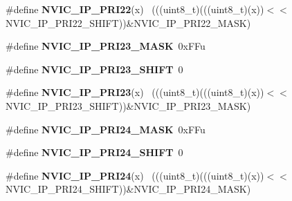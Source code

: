 \begin{DoxyCompactItemize}
\item 
\hypertarget{group___n_v_i_c___register___masks_ga68beece84805f68578bd39bd007ecfe3}{}\#define {\bfseries N\+V\+I\+C\+\_\+\+I\+P\+\_\+\+P\+R\+I22}(x)                                              ~(((uint8\+\_\+t)(((uint8\+\_\+t)(x))$<$$<$N\+V\+I\+C\+\_\+\+I\+P\+\_\+\+P\+R\+I22\+\_\+\+S\+H\+I\+F\+T))\&N\+V\+I\+C\+\_\+\+I\+P\+\_\+\+P\+R\+I22\+\_\+\+M\+A\+S\+K)\label{group___n_v_i_c___register___masks_ga68beece84805f68578bd39bd007ecfe3}

\item 
\hypertarget{group___n_v_i_c___register___masks_ga372050bfcc4aa59b744da6c41c343615}{}\#define {\bfseries N\+V\+I\+C\+\_\+\+I\+P\+\_\+\+P\+R\+I23\+\_\+\+M\+A\+S\+K}~0x\+F\+Fu\label{group___n_v_i_c___register___masks_ga372050bfcc4aa59b744da6c41c343615}

\item 
\hypertarget{group___n_v_i_c___register___masks_ga1d305286e1b025ac4eb96489399b259f}{}\#define {\bfseries N\+V\+I\+C\+\_\+\+I\+P\+\_\+\+P\+R\+I23\+\_\+\+S\+H\+I\+F\+T}~0\label{group___n_v_i_c___register___masks_ga1d305286e1b025ac4eb96489399b259f}

\item 
\hypertarget{group___n_v_i_c___register___masks_gaedf71c1ccd03debbbdf13d1ddb3f1e23}{}\#define {\bfseries N\+V\+I\+C\+\_\+\+I\+P\+\_\+\+P\+R\+I23}(x)                                              ~(((uint8\+\_\+t)(((uint8\+\_\+t)(x))$<$$<$N\+V\+I\+C\+\_\+\+I\+P\+\_\+\+P\+R\+I23\+\_\+\+S\+H\+I\+F\+T))\&N\+V\+I\+C\+\_\+\+I\+P\+\_\+\+P\+R\+I23\+\_\+\+M\+A\+S\+K)\label{group___n_v_i_c___register___masks_gaedf71c1ccd03debbbdf13d1ddb3f1e23}

\item 
\hypertarget{group___n_v_i_c___register___masks_gaa73ef95f88d7118350e5cf30c4fbbe96}{}\#define {\bfseries N\+V\+I\+C\+\_\+\+I\+P\+\_\+\+P\+R\+I24\+\_\+\+M\+A\+S\+K}~0x\+F\+Fu\label{group___n_v_i_c___register___masks_gaa73ef95f88d7118350e5cf30c4fbbe96}

\item 
\hypertarget{group___n_v_i_c___register___masks_ga3d01ac140e5f81472c930ab95d06927c}{}\#define {\bfseries N\+V\+I\+C\+\_\+\+I\+P\+\_\+\+P\+R\+I24\+\_\+\+S\+H\+I\+F\+T}~0\label{group___n_v_i_c___register___masks_ga3d01ac140e5f81472c930ab95d06927c}

\item 
\hypertarget{group___n_v_i_c___register___masks_ga08cc27672e6d5e3c74d1e89fa59231e3}{}\#define {\bfseries N\+V\+I\+C\+\_\+\+I\+P\+\_\+\+P\+R\+I24}(x)                                              ~(((uint8\+\_\+t)(((uint8\+\_\+t)(x))$<$$<$N\+V\+I\+C\+\_\+\+I\+P\+\_\+\+P\+R\+I24\+\_\+\+S\+H\+I\+F\+T))\&N\+V\+I\+C\+\_\+\+I\+P\+\_\+\+P\+R\+I24\+\_\+\+M\+A\+S\+K)\label{group___n_v_i_c___register___masks_ga08cc27672e6d5e3c74d1e89fa59231e3}


\end{DoxyCompactItemize}

